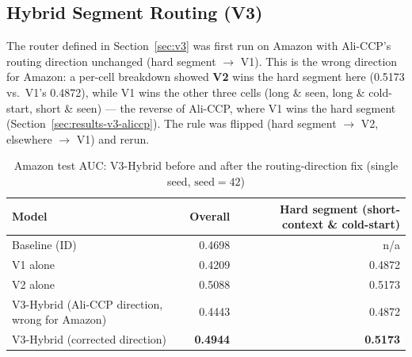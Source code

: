 \subsection{Hybrid Segment Routing (V3)}
\label{sec:results-v3-amazon}

The router defined in Section~\ref{sec:v3} was first run on Amazon with Ali-CCP's routing direction unchanged (hard segment $\to$ V1). This is the wrong direction for Amazon: a per-cell breakdown showed \textbf{V2} wins the hard segment here (0.5173 vs.\ V1's 0.4872), while V1 wins the other three cells (long \& seen, long \& cold-start, short \& seen) --- the reverse of Ali-CCP, where V1 wins the hard segment (Section~\ref{sec:results-v3-aliccp}). The rule was flipped (hard segment $\to$ V2, elsewhere $\to$ V1) and rerun.

\begin{table}[h]
\centering
\caption{Amazon test AUC: V3-Hybrid before and after the routing-direction fix (single seed, $\text{seed}=42$)}
\label{tab:v3-results-amazon}
\begin{tabular}{lrr}
\toprule
Model & Overall & Hard segment (short-context \& cold-start) \\
\midrule
Baseline (ID)                       & 0.4698 & n/a \\
V1 alone                            & 0.4209 & 0.4872 \\
V2 alone                            & 0.5088 & 0.5173 \\
V3-Hybrid (Ali-CCP direction, wrong for Amazon) & 0.4443 & 0.4872 \\
V3-Hybrid (corrected direction)     & \textbf{0.4944} & \textbf{0.5173} \\
\bottomrule
\end{tabular}
\end{table}

